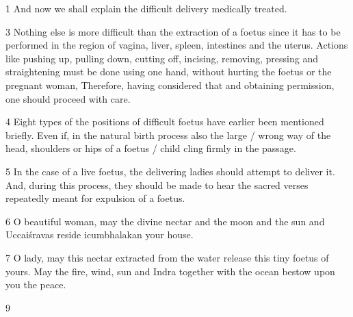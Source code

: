 \begin{translation}
    

    \item [1]  And now we shall explain the difficult delivery medically treated.
    
    \item [3]   Nothing else is more difficult than the extraction of a
foetus since it has to be performed in the region of vagina, liver,
spleen, intestines and the uterus.  Actions like pushing up, pulling
down, cutting off, incising, removing, pressing and straightening
must be done using one hand, without hurting the foetus or the
pregnant woman, Therefore, having considered that and obtaining
permission, one should proceed with care.
    
    \item [4]  Eight types of the positions of difficult
foetus have earlier been mentioned briefly. Even if, in the natural birth process
also the large / wrong way of the head, shoulders or hips of a foetus
/ child cling firmly in the passage.
    
    \item [5]  In the case of a live foetus, the delivering ladies should
attempt to deliver it. And, during this process, they should be made
to hear the sacred verses repeatedly meant for expulsion of a foetus.
  \begin{sloka}
        
    \item [6]  O beautiful woman, may the divine nectar and the moon
and the sun and Uccaiśravas reside icumbhalakan your house.
    
    \item [7]  O lady, may this nectar extracted from the water release
this tiny foetus of yours. May the fire, wind, sun and Indra together
with the ocean bestow upon you the peace.

  \end{sloka}


\item[9] 


\end{translation}
